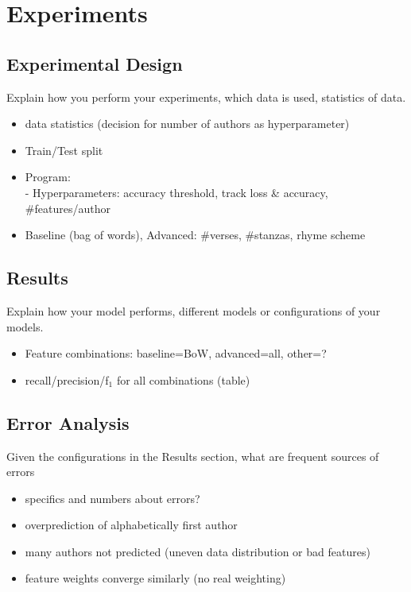 \documentclass[11pt]{article}
\begin{document}
\section{Experiments}

\subsection{Experimental Design}

Explain how you perform your experiments, which data is used, statistics of data.
\begin{itemize}
\item data statistics (decision for number of authors as hyperparameter)
\item Train/Test split
\item Program:\\
- Hyperparameters: accuracy threshold, track loss \& accuracy, \#{}features/author
\item Baseline (bag of words), Advanced: \#{}verses, \#{}stanzas, rhyme scheme
\end{itemize}

\subsection{Results}
Explain how your model performs, different models or configurations of your models.
\begin{itemize}
\item Feature combinations: baseline=BoW, advanced=all, other=?
\item recall/precision/f$_1$ for all combinations (table)
\end{itemize}

\subsection{Error Analysis}

Given the configurations in the Results section, what are frequent sources of errors
\begin{itemize}
\item specifics and numbers about errors?
\item overprediction of alphabetically first author
\item many authors not predicted (uneven data distribution or bad features)
\item feature weights converge similarly (no real weighting)
\end{itemize}
\end{document}
